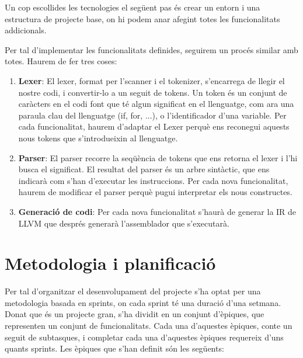 ﻿\documentclass{article}
\begin{document}
Un cop escollides les tecnologies el següent pas és crear un entorn i una
estructura de projecte base, on hi podem anar afegint totes les funcionalitats
addicionals.

Per tal d'implementar les funcionalitats definides, seguirem un procés similar
amb totes. Haurem de fer tres coses:

\begin{enumerate}
    \item \textbf{Lexer}: El lexer, format per l'scanner i el tokenizer,
        s'encarrega de llegir el nostre codi, i convertir-lo a un seguit de 
        tokens. Un token és un conjunt de caràcters en el codi font que té algun 
        significat en el llenguatge, com ara una paraula clau del llenguatge 
        (if, for, ...), o l'identificador d'una variable. Per cada funcionalitat, 
        haurem d'adaptar el Lexer perquè ens reconegui aquests nous tokens que
        s'introdueixin al llenguatge.
    \item \textbf{Parser}: El parser recorre la seqüència de tokens que ens
        retorna el lexer i l'hi busca el significat. El resultat del parser és
        un arbre sintàctic, que ens indicarà com s'han d'executar les instruccions.
        Per cada nova funcionalitat, haurem de modificar el parser perquè pugui
        interpretar els nous constructes.
    \item \textbf{Generació de codi}: Per cada nova funcionalitat s'haurà de 
        generar la IR de LLVM que després generarà l'assemblador que s'executarà.
\end{enumerate}

\section{Metodologia i planificació}
Per tal d'organitzar el desenvolupament del projecte s'ha optat per una metodologia
basada en sprints, on cada sprint té una duració d'una setmana. Donat que és un
projecte gran, s'ha dividit en un conjunt d'èpiques, que representen un conjunt
de funcionalitats. Cada una d'aquestes èpiques, conte un seguit de subtasques, i
completar cada una d'aquestes èpiques requereix d'uns quants sprints. Les èpiques
que s'han definit són les següents:
\end{document}
